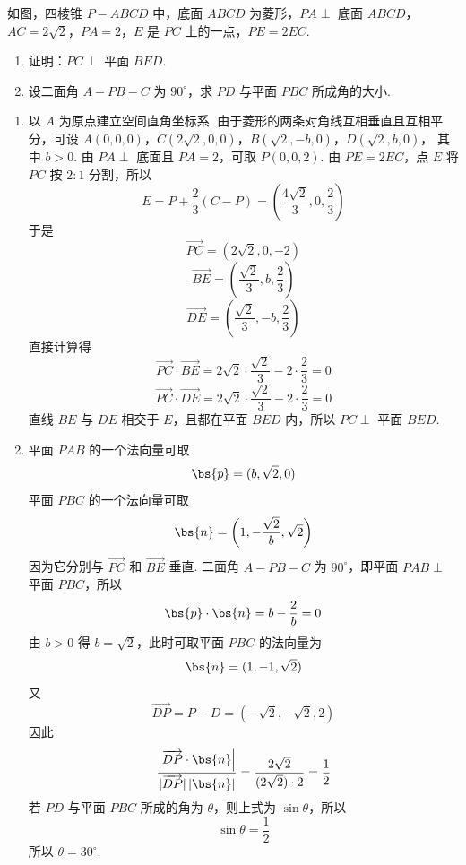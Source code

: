 \begin{problem}
如图，四棱锥 \(P - ABCD\) 中，底面 \(ABCD\) 为菱形，\(PA \perp\) 底面 \(ABCD\)，\(AC = 2\sqrt{2}\)，\(PA = 2\)，\(E\) 是 \(PC\) 上的一点，\(PE = 2EC\).
\begin{enumerate}
\item 证明：\(PC \perp\) 平面 \(BED\).
\item 设二面角 \(A - PB - C\) 为 \(90^{\circ}\)，求 \(PD\) 与平面 \(PBC\) 所成角的大小.
\end{enumerate}
\end{problem}

\begin{solution}
\begin{enumerate}
\item 以 \(A\) 为原点建立空间直角坐标系. 由于菱形的两条对角线互相垂直且互相平分，可设
\(A(0,0,0)\)，\(C(2\sqrt2,0,0)\)，\(B(\sqrt2,-b,0)\)，\(D(\sqrt2,b,0)\)，
其中 \(b>0\). 由 \(PA\perp\) 底面且 \(PA=2\)，可取 \(P(0,0,2)\). 由 \(PE=2EC\)，点 \(E\) 将 \(PC\) 按 \(2:1\) 分割，所以
\[
E=P+\frac23(C-P)=\left(\frac{4\sqrt2}{3},0,\frac23\right)
\]
于是
\[
\overrightarrow{PC}=(2\sqrt2,0,-2)
\]
\[
\overrightarrow{BE}=\left(\frac{\sqrt2}{3},b,\frac23\right)
\]
\[
\overrightarrow{DE}=\left(\frac{\sqrt2}{3},-b,\frac23\right)
\]
直接计算得
\[
\overrightarrow{PC}\cdot\overrightarrow{BE}
=2\sqrt2\cdot\frac{\sqrt2}{3}-2\cdot\frac23=0
\]
\[
\overrightarrow{PC}\cdot\overrightarrow{DE}
=2\sqrt2\cdot\frac{\sqrt2}{3}-2\cdot\frac23=0
\]
直线 \(BE\) 与 \(DE\) 相交于 \(E\)，且都在平面 \(BED\) 内，所以 \(PC\perp\) 平面 \(BED\).

\item 平面 \(PAB\) 的一个法向量可取
\[
\bs{p}=(b,\sqrt2,0)
\]
平面 \(PBC\) 的一个法向量可取
\[
\bs{n}=\left(1,-\frac{\sqrt2}{b},\sqrt2\right)
\]
因为它分别与 \(\overrightarrow{PC}\) 和 \(\overrightarrow{BE}\) 垂直. 二面角 \(A-PB-C\) 为 \(90^{\circ}\)，即平面 \(PAB\perp\) 平面 \(PBC\)，所以
\[
\bs{p}\cdot\bs{n}
=b-\frac{2}{b}=0
\]
由 \(b>0\) 得 \(b=\sqrt2\)，此时可取平面 \(PBC\) 的法向量为
\[
\bs{n}=(1,-1,\sqrt2)
\]
又
\[
\overrightarrow{DP}=P-D=(-\sqrt2,-\sqrt2,2)
\]
因此
\[
\frac{\left|\overrightarrow{DP}\cdot\bs{n}\right|}
{|\overrightarrow{DP}|\,|\bs{n}|}
=\frac{2\sqrt2}{(2\sqrt2)\cdot2}=\frac12
\]
若 \(PD\) 与平面 \(PBC\) 所成的角为 \(\theta\)，则上式为 \(\sin\theta\)，所以
\[
\sin\theta=\frac12
\]
所以 \(\theta=30^{\circ}\).
\end{enumerate}
\end{solution}

